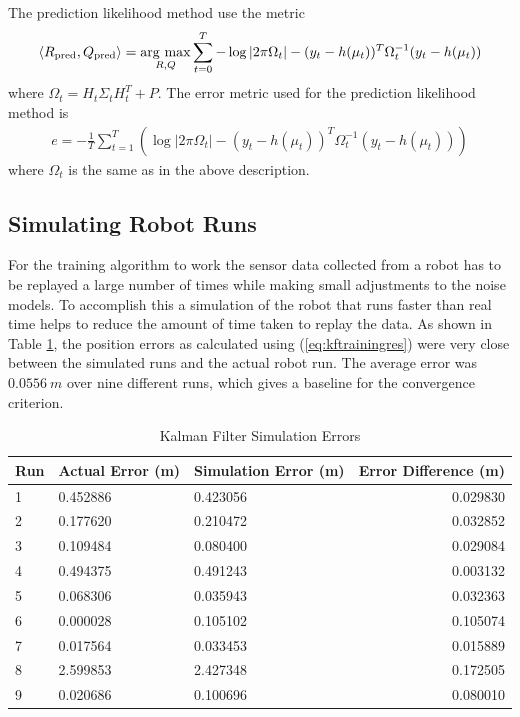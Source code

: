The prediction likelihood method use the metric
\begin{align*}
\left<R_{\text{pred}},Q_{\text{pred}}\right> = \mathop{\arg\,\max}\limits_{R,Q}\sum_{t=0}^T -\log|2\pi\Omega_t| - (y_t-h(\mu_t))^T\Omega_t^{-1}(y_t-h(\mu_t))
\end{align*}
where $\Omega_t = H_t\Sigma_tH_t^T+P$. The error metric used for the prediction likelihood method is
\begin{align}
\label{eq:kftrainingpred}
e = -\frac{1}{T}\sum_{t=1}^T \left(\log|2\pi\Omega_t| - (y_t-h(\mu_t))^T\Omega_t^{-1}(y_t-h(\mu_t))\right)
\end{align}
where $\Omega_t$ is the same as in the above description.

\subsection{Simulating Robot Runs}
\label{sec:kfSimulation}
For the training algorithm to work the sensor data collected from a robot has to be replayed a large number of times while making small adjustments to the noise models. To accomplish this a simulation of the robot that runs faster than real time helps to reduce the amount of time taken to replay the data. As shown in Table \ref{tab:kfSimulationErrors}, the position errors as calculated using (\ref{eq:kftrainingres}) were very close between the simulated runs and the actual robot run. The average error was $0.0556~m$ over nine different runs, which gives a baseline for the convergence criterion.

\begin{table}[ht!]
\caption{Kalman Filter Simulation Errors}
\small
\centering
\begin{tabular}{@{}lllr@{}} \toprule
Run & Actual Error (m)  & Simulation Error (m) & Error Difference (m) \\ \midrule
1   & 0.452886          & 0.423056             & 0.029830             \\
2   & 0.177620          & 0.210472             & 0.032852             \\
3   & 0.109484          & 0.080400             & 0.029084             \\
4   & 0.494375          & 0.491243             & 0.003132             \\
5   & 0.068306          & 0.035943             & 0.032363             \\
6   & 0.000028          & 0.105102             & 0.105074             \\
7   & 0.017564          & 0.033453             & 0.015889             \\
8   & 2.599853          & 2.427348             & 0.172505             \\
9   & 0.020686          & 0.100696             & 0.080010             \\ \bottomrule
\end{tabular}
\label{tab:kfSimulationErrors}
\end{table}


